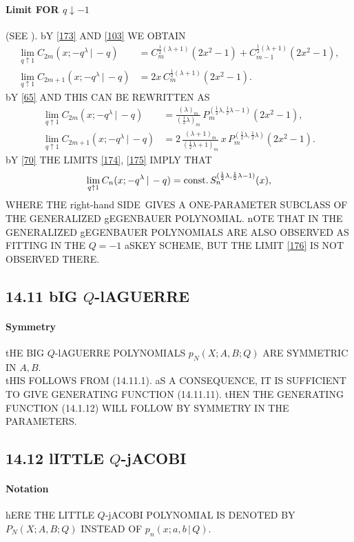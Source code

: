 \documentclass[twoside,11pt]{article}
\newcommand\sa{\smallskipamount}
\newcommand\sLP{\\[\sa]}
\newcommand\la\lambda
\newcommand\half{\frac12}
\newcommand\const{{\rm const.}\,}
\newcommand\RHS{right-hand SIDE}
\begin{document}
\paragraph{Limit FOR $q\downarrow-1$} 
(SEE ). 
bY \eqref{173} AND \eqref{103} WE OBTAIN 
\begin{align*} 
\lim_{q\uparrow1} C_{2m}(x;-q^\la\,|\,-q)&= 
C_m^{\half(\la+1)}(2x^2-1)+C_{m-1}^{\half(\la+1)}(2x^2-1),\\ 
\lim_{q\uparrow1} C_{2m+1}(x;-q^\la\,|\,-q)&= 
2x\,C_m^{\half(\la+1)}(2x^2-1). 
\end{align*} 
bY \eqref{65} AND  THIS CAN BE REWRITTEN AS 
\begin{align} 
\lim_{q\uparrow1} C_{2m}(x;-q^\la\,|\,-q)&= 
\frac{(\la)_m}{(\half\la)_m}\, P_m^{(\half\la,\half\la-1)}(2x^2-1), 
\label{174}\\ 
\lim_{q\uparrow1} C_{2m+1}(x;-q^\la\,|\,-q)&= 
2\,\frac{(\la+1)_m}{(\half\la+1)_m}\,x\,P_m^{(\half\la,\half\la)}(2x^2-1). 
\label{175} 
\end{align} 
bY \eqref{70} THE LIMITS \eqref{174}, \eqref{175} IMPLY THAT 
\begin{equation} 
\lim_{q\uparrow1} C_n(x;-q^\la\,|\,-q) 
=\const S_n^{(\half\la,\half\la-1)}(x), 
\label{176} 
\end{equation} 
WHERE THE \RHS\ GIVES A ONE-PARAMETER SUBCLASS OF THE 
GENERALIZED gEGENBAUER POLYNOMIAL. nOTE THAT IN 
\cite[Section 7.1]{k28} THE GENERALIZED gEGENBAUER POLYNOMIALS ARE 
ALSO OBSERVED AS FITTING IN THE $Q=-1$ aSKEY SCHEME, BUT THE LIMIT 
\eqref{176} IS NOT OBSERVED THERE. 
% 
\subsection*{14.11 bIG $Q$-lAGUERRE} 
\label{sec14.11} 
% 
\paragraph{Symmetry} 
tHE BIG $Q$-lAGUERRE POLYNOMIALS $p_N(X;A,B;Q)$ ARE SYMMETRIC IN $A,B$. 
\sLP 
tHIS FOLLOWS FROM (14.11.1). 
aS A CONSEQUENCE, IT IS SUFFICIENT TO GIVE GENERATING FUNCTION (14.11.11). tHEN THE GENERATING 
FUNCTION (14.1.12) WILL FOLLOW BY SYMMETRY IN THE PARAMETERS. 
% 
\subsection*{14.12 lITTLE $Q$-jACOBI} 
\label{sec14.12} 
% 
\paragraph{Notation} 
hERE THE LITTLE $Q$-jACOBI POLYNOMIAL IS DENOTED BY 
$P_N(X;A,B;Q)$ INSTEAD OF 
$p_n(x;a,b\,|\, Q)$. 
% 
\end{document}
